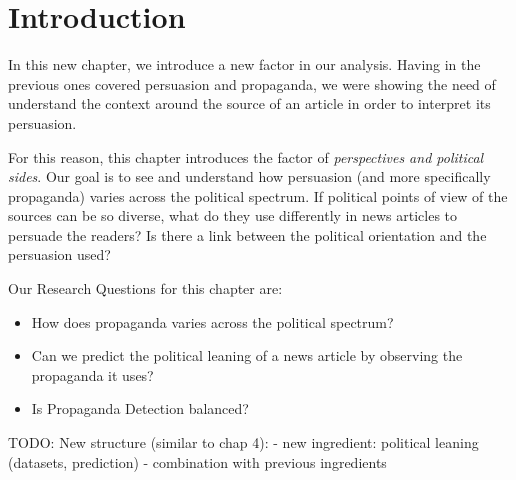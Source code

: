 \label{chap:political_sides}

\section{Introduction}


In this new chapter, we introduce a new factor in our analysis.
Having in the previous ones covered persuasion and propaganda, we were showing the need of understand the context around the source of an article in order to interpret its persuasion.

For this reason, this chapter introduces the factor of \emph{perspectives and political sides}.
Our goal is to see and understand how persuasion (and more specifically propaganda) varies across the political spectrum. If political points of view of the sources can be so diverse, what do they use differently in news articles to persuade the readers? Is there a link between the political orientation and the persuasion used?


Our Research Questions for this chapter are:
\begin{itemize}
    \item How does propaganda varies across the political spectrum?
    \item Can we predict the political leaning of a news article by observing the propaganda it uses?
    \item Is Propaganda Detection balanced?
\end{itemize}



TODO: New structure (similar to chap 4):
- new ingredient: political leaning (datasets, prediction)
- combination with previous ingredients


